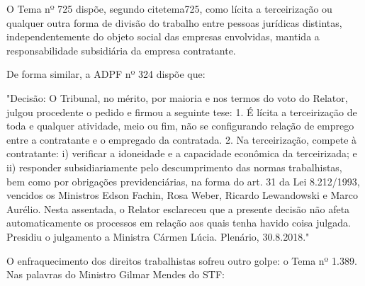 O Tema nº 725 dispõe, segundo cite{tema725}, como lícita a terceirização ou qualquer outra forma de divisão do trabalho entre pessoas jurídicas distintas, independentemente do objeto social das empresas envolvidas, mantida a responsabilidade subsidiária da empresa contratante.

De forma similar, a ADPF nº 324 dispõe que:

\noindent
\begin{flushleft}
	\setlength{\leftskip}{4cm}
	\small
	"Decisão: O Tribunal, no mérito, por maioria e nos termos do voto do Relator, julgou procedente o pedido e firmou a seguinte tese: 1. É lícita a terceirização de toda e qualquer atividade, meio ou fim, não se configurando relação de emprego entre a contratante e o empregado da contratada. 2. Na terceirização, compete à contratante: i) verificar a idoneidade e a capacidade econômica da terceirizada; e ii) responder subsidiariamente pelo descumprimento das normas trabalhistas, bem como por obrigações previdenciárias, na forma do art. 31 da Lei 8.212/1993, vencidos os Ministros Edson Fachin, Rosa Weber, Ricardo Lewandowski e Marco Aurélio. Nesta assentada, o Relator esclareceu que a presente decisão não afeta automaticamente os processos em relação aos quais tenha havido coisa julgada. Presidiu o julgamento a Ministra Cármen Lúcia. Plenário, 30.8.2018." \cite{adpf324}
\end{flushleft}

O enfraquecimento dos direitos trabalhistas sofreu outro golpe: o Tema nº 1.389. Nas palavras do Ministro Gilmar Mendes do STF: 

